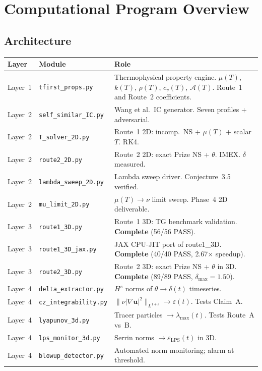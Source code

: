 \documentclass[11pt, a4paper]{article}
\theoremstyle{definition}
\theoremstyle{remark}
\newcommand{\Afield}{\mathcal{A}}
\newcommand{\eps}{\varepsilon}
\newcommand{\thet}{\theta}
\newcommand{\epslps}{\eps_{\mathrm{LPS}}}
\newcommand{\delt}{\delta}
\begin{document}
\section{Computational Program Overview}

\subsection{Architecture}

\begin{center}
\begin{tabular}{llp{7.5cm}}
\toprule
\textbf{Layer} & \textbf{Module} & \textbf{Role} \\
\midrule
Layer~1 & \texttt{tfirst\_props.py} & Thermophysical property engine.
  $\mu(T)$, $k(T)$, $\rho(T)$, $c_v(T)$, $\Afield(T)$. Route~1 and Route~2 coefficients. \\[4pt]
Layer~2 & \texttt{self\_similar\_IC.py} & Wang et al.\ IC generator. Seven profiles + adversarial. \\[4pt]
Layer~2 & \texttt{T\_solver\_2D.py} & Route~1 2D: incomp.\ NS + $\mu(T)$ + scalar $T$. RK4. \\[4pt]
Layer~2 & \texttt{route2\_2D.py} & Route~2 2D: exact Prize NS + $\thet$. IMEX. $\delt$ measured. \\[4pt]
Layer~2 & \texttt{lambda\_sweep\_2D.py} & Lambda sweep driver. Conjecture~3.5 verified. \\[4pt]
Layer~2 & \texttt{mu\_limit\_2D.py} & $\mu(T)\to\nu$ limit sweep. Phase~4 2D deliverable. \\[4pt]
Layer~3 & \texttt{route1\_3D.py} & Route~1 3D: TG benchmark validation. \textbf{Complete} (56/56 PASS). \\[4pt]
Layer~3 & \texttt{route1\_3D\_jax.py} & JAX CPU-JIT port of route1\_3D. \textbf{Complete} (40/40 PASS, 2.67$\times$ speedup). \\[4pt]
Layer~3 & \texttt{route2\_3D.py} & Route~2 3D: exact Prize NS + $\thet$ in 3D. \textbf{Complete} (89/89 PASS, $\delt_{\max}=1.50$). \\[4pt]
Layer~4 & \texttt{delta\_extractor.py} & $H^s$ norms of $\thet \to \delt(t)$ timeseries. \\[4pt]
Layer~4 & \texttt{cz\_integrability.py} & $\|\nu|\nabla\mathbf{u}|^2\|_{L^{1+\eps}}\to\eps(t)$. Tests Claim~A. \\[4pt]
Layer~4 & \texttt{lyapunov\_3d.py} & Tracer particles $\to\lambda_{\max}(t)$. Tests Route~A vs~B. \\[4pt]
Layer~4 & \texttt{lps\_monitor\_3d.py} & Serrin norms $\to\epslps(t)$ in 3D. \\[4pt]
Layer~4 & \texttt{blowup\_detector.py} & Automated norm monitoring; alarm at threshold. \\
\bottomrule
\end{tabular}
\end{center}
\end{document}
